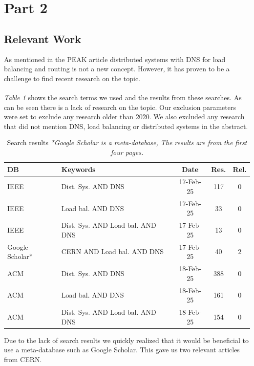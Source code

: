 \documentclass[12pt]{article}
\begin{document}
\section{Part 2}
\subsection{Relevant Work}
As mentioned in the PEAK article \cite{heimonenPreprintPEAKProxy} distributed systems with DNS for load balancing and routing is not a new concept.
However, it has proven to be a challenge to find recent research on the topic.
\\
\\
\textit{Table 1} shows the search terms we used and the results from these searches. As can be seen
there is a lack of research on the topic. Our exclusion parameters were set to exclude any research older than 2020.
We also excluded any research that did not mention DNS, load balancing or distributed systems in the abstract.

\begin{table}[H]
    \centering
    \begin{tabularx}{\textwidth}{|l|X|c|c|c|}
        \hline
        \textbf{DB} & \textbf{Keywords} & \textbf{Date} & \textbf{Res.} & \textbf{Rel.} \\
        \hline
        IEEE & Dist. Sys. AND DNS & 17-Feb-25 & 117 & 0 \\
        \hline
        IEEE & Load bal. AND DNS & 17-Feb-25 & 33 & 0 \\
        \hline
        IEEE & Dist. Sys. AND Load bal. AND DNS & 17-Feb-25 & 13 & 0 \\
        \hline
        Google Scholar* & CERN AND Load bal. AND DNS & 17-Feb-25 & 40 & 2 \\
        \hline
        ACM & Dist. Sys. AND DNS & 18-Feb-25 & 388 & 0 \\
        \hline
        ACM & Load bal. AND DNS & 18-Feb-25 & 161 & 0 \\
        \hline
        ACM & Dist. Sys. AND Load bal. AND DNS & 18-Feb-25 & 154 & 0 \\
        \hline
    \end{tabularx}
    \caption{Search results \textit{*Google Scholar is a meta-database, The results are from the first four pages.}}
\end{table}

Due to the lack of search results we quickly realized that it would be beneficial to use a meta-database such as Google Scholar.
This gave us two relevant articles from CERN.
\end{document}
